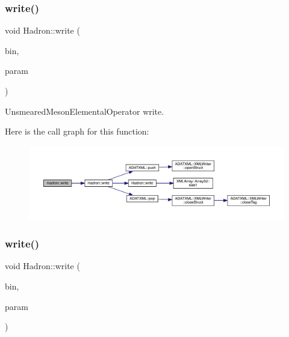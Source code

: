 \subsubsection{\texorpdfstring{write()}{write()}\hspace{0.1cm}{\footnotesize\ttfamily [69/95]}}
{\footnotesize\ttfamily void Hadron\+::write (\begin{DoxyParamCaption}\item[{\mbox{\hyperlink{classADATIO_1_1BinaryWriter}{Binary\+Writer}} \&}]{bin,  }\item[{const \mbox{\hyperlink{structHadron_1_1ValUnsmearedMesonElementalOperator__t}{Val\+Unsmeared\+Meson\+Elemental\+Operator\+\_\+t}} \&}]{param }\end{DoxyParamCaption})}



Unsmeared\+Meson\+Elemental\+Operator write. 

Here is the call graph for this function\+:
\nopagebreak
\begin{figure}[H]
\begin{center}
\leavevmode
\includegraphics[width=350pt]{d1/daf/namespaceHadron_a78737ee2e9f7f708d926ec9f531c8f61_cgraph}
\end{center}
\end{figure}
\mbox{\label{namespaceHadron_a6ba238c6945bb5d95ae189cfee93a690}} 
\subsubsection{\texorpdfstring{write()}{write()}\hspace{0.1cm}{\footnotesize\ttfamily [70/95]}}
{\footnotesize\ttfamily void Hadron\+::write (\begin{DoxyParamCaption}\item[{\mbox{\hyperlink{classADATIO_1_1BinaryWriter}{Binary\+Writer}} \&}]{bin,  }\item[{const \mbox{\hyperlink{structHadron_1_1ValBaryonElementalOperator__t}{Val\+Baryon\+Elemental\+Operator\+\_\+t}} \&}]{param }\end{DoxyParamCaption})}



